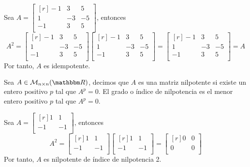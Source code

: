 \begin{example}
    Sea $A = \begin{bmatrix*}[r]
        -1 & 3 & 5 \\
        1 & -3 & -5 \\
        -1 & 3 & 5 \\
    \end{bmatrix*}$, entonces
    $$A^2 = \begin{bmatrix*}[r]
        -1 & 3 & 5 \\
        1 & -3 & -5 \\
        -1 & 3 & 5 \\
    \end{bmatrix*} \begin{bmatrix*}[r]
        -1 & 3 & 5 \\
        1 & -3 & -5 \\
        -1 & 3 & 5 \\
    \end{bmatrix*} = \begin{bmatrix*}[r]
        -1 & 3 & 5 \\
        1 & -3 & -5 \\
        -1 & 3 & 5 \\
    \end{bmatrix*} = A$$
    Por tanto, $A$ es idempotente.
\end{example}

\begin{definition}
    Sea $A \in \mathcal{M}_{n \times n}(\RR)$, decimos que $A$ es una matriz nilpotente si existe un entero positivo $p$ tal que $A^p=0$. El grado o índice de nilpotencia es el menor entero positivo $p$ tal que $A^p=0$.
\end{definition}

\begin{example}
    Sea $A = \begin{bmatrix*}[r]
        1 & 1 \\
        -1 & -1 \\
    \end{bmatrix*}$, entonces
    $$A^2 = \begin{bmatrix*}[r]
        1 & 1 \\
        -1 & -1 \\
    \end{bmatrix*} \begin{bmatrix*}[r]
        1 & 1 \\
        -1 & -1 \\
    \end{bmatrix*} = \begin{bmatrix*}[r]
        0 & 0 \\
        0 & 0 \\
    \end{bmatrix*}$$
    Por tanto, $A$ es nilpotente de índice de nilpotencia 2.
\end{example}

